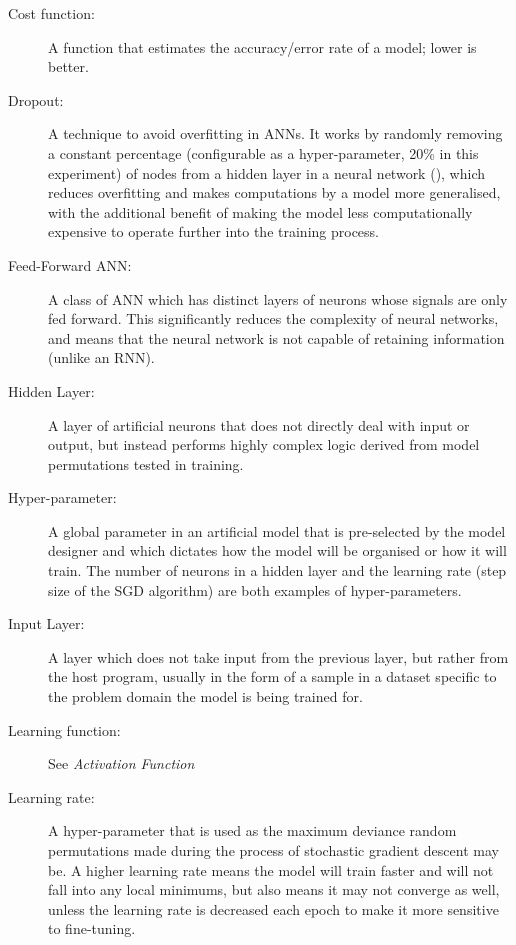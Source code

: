 \documentclass[]{report}
\begin{document}
\begin{description}
\item[Cost function:] A function that estimates the accuracy/error rate of a model; lower is better.

\item[Dropout:] A technique to avoid overfitting in ANNs. It works by randomly removing a constant percentage (configurable as a hyper-parameter, 20\% in this experiment) of nodes from a hidden layer in a neural network (\cite{dropout14}), which reduces overfitting and makes computations by a model more generalised, with the additional benefit of making the model less computationally expensive to operate further into the training process.

\item[Feed-Forward ANN:] A class of ANN which has distinct layers of neurons whose signals are only fed forward. This significantly reduces the complexity of neural networks, and means that the neural network is not capable of retaining information (unlike an RNN).

\item[Hidden Layer:] A layer of artificial neurons that does not directly deal with input or output, but instead performs highly complex logic derived from model permutations tested in training.

\item[Hyper-parameter:] A global parameter in an artificial model that is pre-selected by the model designer and which dictates how the model will be organised or how it will train. The number of neurons in a hidden layer and the learning rate (step size of the SGD algorithm) are both examples of hyper-parameters.

\item[Input Layer:] A layer which does not take input from the previous layer, but rather from the host program, usually in the form of a sample in a dataset specific to the problem domain the model is being trained for.

\item[Learning function:] See \textit{Activation Function}

\item[Learning rate:] A hyper-parameter that is used as the maximum deviance random permutations made during the process of stochastic gradient descent may be. A higher learning rate means the model will train faster and will not fall into any local minimums, but also means it may not converge as well, unless the learning rate is decreased each epoch to make it more sensitive to fine-tuning.


\end{description}
\end{document}
